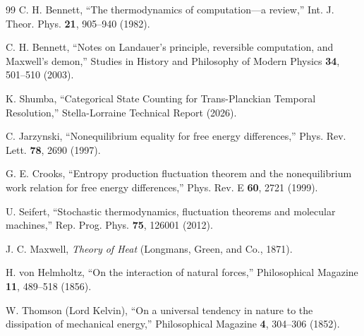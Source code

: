 \documentclass[twocolumn,10pt]{article}
\begin{document}
\begin{thebibliography}{99}
 C. H. Bennett, ``The thermodynamics of computation---a review,'' Int. J. Theor. Phys. \textbf{21}, 905--940 (1982).

 C. H. Bennett, ``Notes on Landauer's principle, reversible computation, and Maxwell's demon,'' Studies in History and Philosophy of Modern Physics \textbf{34}, 501--510 (2003).

 K. Shumba, ``Categorical State Counting for Trans-Planckian Temporal Resolution,'' Stella-Lorraine Technical Report (2026).

 C. Jarzynski, ``Nonequilibrium equality for free energy differences,'' Phys. Rev. Lett. \textbf{78}, 2690 (1997).

 G. E. Crooks, ``Entropy production fluctuation theorem and the nonequilibrium work relation for free energy differences,'' Phys. Rev. E \textbf{60}, 2721 (1999).

 U. Seifert, ``Stochastic thermodynamics, fluctuation theorems and molecular machines,'' Rep. Prog. Phys. \textbf{75}, 126001 (2012).

 J. C. Maxwell, \textit{Theory of Heat} (Longmans, Green, and Co., 1871).

 H. von Helmholtz, ``On the interaction of natural forces,'' Philosophical Magazine \textbf{11}, 489--518 (1856).

 W. Thomson (Lord Kelvin), ``On a universal tendency in nature to the dissipation of mechanical energy,'' Philosophical Magazine \textbf{4}, 304--306 (1852).

\end{thebibliography}
\end{document}
